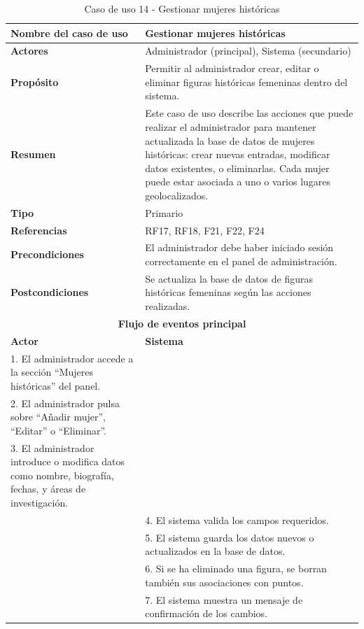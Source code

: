 \begin{table}[H]
\centering
\caption{Caso de uso 14 - Gestionar mujeres históricas}
\begin{tabular}{|p{4.5cm}|p{10.5cm}|}
\hline
\textbf{Nombre del caso de uso} & Gestionar mujeres históricas \\
\hline
\textbf{Actores} & Administrador (principal), Sistema (secundario) \\
\hline
\textbf{Propósito} & Permitir al administrador crear, editar o eliminar figuras históricas femeninas dentro del sistema. \\
\hline
\textbf{Resumen} & Este caso de uso describe las acciones que puede realizar el administrador para mantener actualizada la base de datos de mujeres históricas: crear nuevas entradas, modificar datos existentes, o eliminarlas. Cada mujer puede estar asociada a uno o varios lugares geolocalizados. \\
\hline
\textbf{Tipo} & Primario \\
\hline
\textbf{Referencias} & RF17, RF18, F21, F22, F24 \\
\hline
\textbf{Precondiciones} & El administrador debe haber iniciado sesión correctamente en el panel de administración. \\
\hline
\textbf{Postcondiciones} & Se actualiza la base de datos de figuras históricas femeninas según las acciones realizadas. \\
\hline
\multicolumn{2}{|c|}{\textbf{Flujo de eventos principal}} \\
\hline
\textbf{Actor} & \textbf{Sistema} \\
\hline
1. El administrador accede a la sección “Mujeres históricas” del panel. & \\
\hline
2. El administrador pulsa sobre “Añadir mujer”, “Editar” o “Eliminar”. & \\
\hline
3. El administrador introduce o modifica datos como nombre, biografía, fechas, y áreas de investigación. & \\
\hline
& 4. El sistema valida los campos requeridos. \\
\hline
& 5. El sistema guarda los datos nuevos o actualizados en la base de datos. \\
\hline
& 6. Si se ha eliminado una figura, se borran también sus asociaciones con puntos. \\
\hline
& 7. El sistema muestra un mensaje de confirmación de los cambios. \\
\hline
\end{tabular}
\end{table}

